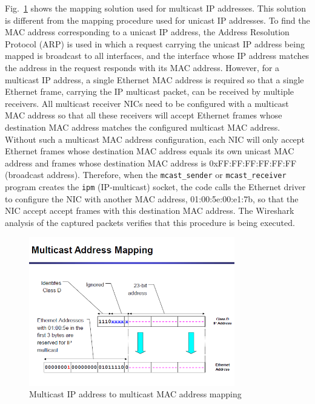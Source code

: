 Fig.~\ref{fig:mapping} shows the mapping solution used for multicast IP addresses. This solution is different
from the mapping procedure used for unicast IP addresses. To find the MAC address corresponding
to a unicast IP address, the Address Resolution Protocol (ARP) is used in which a request carrying the unicast
IP address being mapped is broadcast to all interfaces, and the interface whose IP address matches the address in the
request responds with its MAC address. However, for a multicast IP address, a single Ethernet MAC address
is required so that a single Ethernet frame, carrying the IP multicast packet, can be received by multiple receivers.
All multicast receiver NICs need to be configured with a multicast MAC address so that all these receivers will accept Ethernet frames whose destination MAC address matches the configured multicast MAC address. Without such a
multicast MAC address configuration, each  NIC will only accept Ethernet frames whose destination MAC address equals its own unicast MAC address and frames whose destination MAC address is 0xFF:FF:FF:FF:FF:FF (broadcast address). Therefore, when the \texttt{mcast\_sender} or \texttt{mcast\_receiver} program creates the \texttt{ipm} (IP-multicast) socket, the code calls the Ethernet driver to configure the NIC with another MAC address, 01:00:5e:00:e1:7b, so that the NIC accept accept frames with this destination MAC address. The Wireshark analysis of the captured packets verifies that this procedure
is being executed.
\begin{figure}[htb!]
\centering
\includegraphics[width=0.8\textwidth]{figures/mapping.png}
\caption{Multicast IP address to multicast MAC address mapping}
\label{fig:mapping}
\end{figure}


